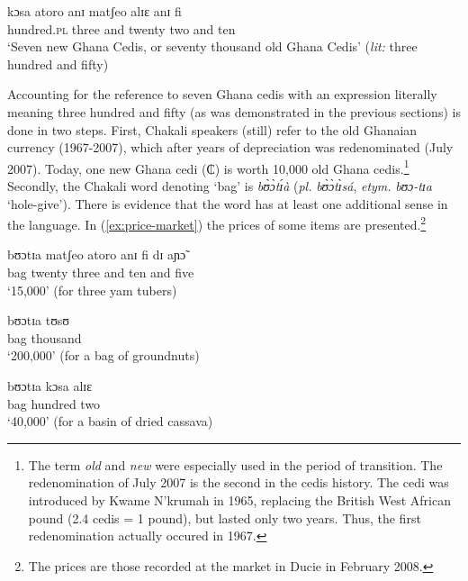 \begin{exe}
\begin{exe}
\begin{exe}
{\begin{exe}
\begin{exe}
\begin{exe}
\begin{exe}
\begin{exe}
\begin{exe}
\begin{exe}
\begin{xlist}
\begin{exe}
\begin{exe}
\begin{exe}
\begin{exe}
\ex\label{ex:70000}
\gll kɔsa atoro anɪ matʃeo alɪɛ anɪ fi\\
 hundred.\textsc{pl} three and twenty two and ten\\
\glt `Seven new Ghana Cedis, or seventy thousand old Ghana Cedis' ({\it lit:}
three
hundred and fifty)\\
\end{exe} 


Accounting for the reference to seven Ghana cedis with an expression literally
meaning three hundred and fifty (as was demonstrated in the previous
sections) is done in two steps.  First, Chakali speakers (still) refer
to the old Ghanaian currency (1967-2007), which after years of depreciation was
redenominated (July 2007). Today,  one new Ghana cedi ({\W ₵}) is worth 10,000
old Ghana cedis.\footnote{The term \textit{old} and \textit{new} were especially
used in the period of transition. The redenomination of July 2007 is the second
in the cedis history. The cedi was introduced by Kwame N'krumah in 1965,
replacing the British West African pound (2.4 cedis = 1 pound), but lasted only
two years. Thus,  the first redenomination actually occured in 1967.}  Secondly,
the Chakali word denoting `bag'  is  {\it bʊ̀ɔ̀tɪ́à} 
(\textit{pl.} {\it  bʊ̀ɔ̀tɪ̀sá},  \textit{etym.}  {\it bʊɔ-tɪa} `hole-give').  
There is evidence
that the word has at least one additional sense in the language. In
(\ref{ex:price-market}) the prices of some items are presented.\footnote{The
prices are those recorded at the market in Ducie in
February 2008.}


\ea\label{ex:price-market}

\ea\label{ex:yamtubers}
\gll bʊɔtɪa matʃeo atoro anɪ fi dɪ  aɲɔ̃\\
bag twenty three and ten and five\\
\glt `15,000' (for  three yam tubers)




\ex\label{ex:groundnutbag}
\gll bʊɔtɪa tʊsʊ\\
bag thousand\\
\glt `200,000' (for a bag of groundnuts)


\ex\label{ex:driedcassava}
\gll bʊɔtɪa kɔsa alɪɛ\\
bag hundred two\\
\glt `40,000' (for a basin of dried cassava)



\end{exe}
\end{exe}
\end{exe}
\end{xlist}
\end{exe}
\end{exe}
\end{exe}
\end{exe}
\end{exe}
\end{exe}
\end{exe}}
\end{exe}
\end{exe}
\end{exe}
